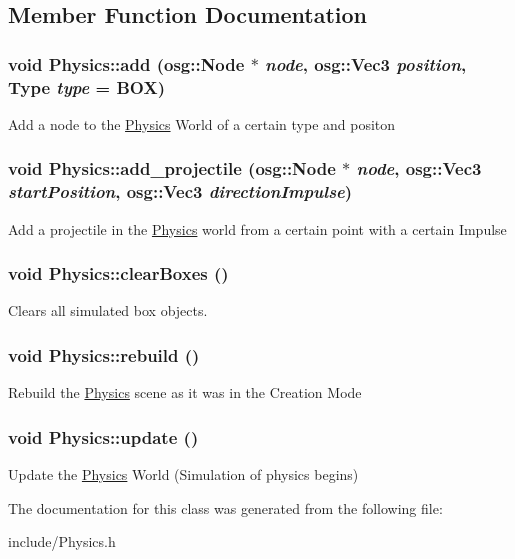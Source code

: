 \subsection{Member Function Documentation}
\hypertarget{class_physics_a9bf392c23a2e01bbd0fa99804e06d3ba}{
\subsubsection[{add}]{\setlength{\rightskip}{0pt plus 5cm}void Physics::add (osg::Node $\ast$ {\em node}, \/  osg::Vec3 {\em position}, \/  {\bf Type} {\em type} = {\ttfamily BOX})}}
\label{class_physics_a9bf392c23a2e01bbd0fa99804e06d3ba}
Add a node to the \hyperlink{class_physics}{Physics} World of a certain type and positon \hypertarget{class_physics_a4b834cb27b02c73026d8c45da29a193e}{
\subsubsection[{add\_\-projectile}]{\setlength{\rightskip}{0pt plus 5cm}void Physics::add\_\-projectile (osg::Node $\ast$ {\em node}, \/  osg::Vec3 {\em startPosition}, \/  osg::Vec3 {\em directionImpulse})}}
\label{class_physics_a4b834cb27b02c73026d8c45da29a193e}
Add a projectile in the \hyperlink{class_physics}{Physics} world from a certain point with a certain Impulse \hypertarget{class_physics_acd1a87f8356086e412b3be849860a687}{
\subsubsection[{clearBoxes}]{\setlength{\rightskip}{0pt plus 5cm}void Physics::clearBoxes ()}}
\label{class_physics_acd1a87f8356086e412b3be849860a687}
Clears all simulated box objects. \hypertarget{class_physics_afe2651aeeb5fcb01189f42d04c79692e}{
\subsubsection[{rebuild}]{\setlength{\rightskip}{0pt plus 5cm}void Physics::rebuild ()}}
\label{class_physics_afe2651aeeb5fcb01189f42d04c79692e}
Rebuild the \hyperlink{class_physics}{Physics} scene as it was in the Creation Mode \hypertarget{class_physics_a309579d8a466dbcc36c6b4db136b1e9b}{
\subsubsection[{update}]{\setlength{\rightskip}{0pt plus 5cm}void Physics::update ()}}
\label{class_physics_a309579d8a466dbcc36c6b4db136b1e9b}
Update the \hyperlink{class_physics}{Physics} World (Simulation of physics begins) 

The documentation for this class was generated from the following file:\begin{DoxyCompactItemize}
\item 
include/Physics.h\end{DoxyCompactItemize}
